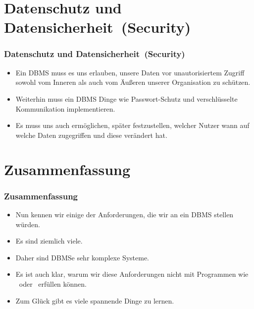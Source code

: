 \documentclass[aspectratio=169,mathserif,notheorems]{beamer}%
\begin{document}
\section{Datenschutz und Datensicherheit~(Security)}%
\begin{frame}%
\frametitle{Datenschutz und Datensicherheit~(Security)}
\begin{itemize}%
\item Ein DBMS muss es uns erlauben, unsere Daten vor unautorisiertem Zugriff sowohl vom Inneren als auch vom Äußeren unserer Organisation zu schützen.%
\item<7-> Weiterhin muss ein DBMS Dinge wie Passwort-Schutz und verschlüsselte Kommunikation implementieren.
\item<8-> Es muss uns auch ermöglichen, später festzustellen, welcher Nutzer wann auf welche Daten zugegriffen und diese verändert hat.%
\end{itemize}%
\end{frame}%
%
\section{Zusammenfassung}%
\begin{frame}%
\frametitle{Zusammenfassung}%
\begin{itemize}%
\item Nun kennen wir einige der Anforderungen, die wir an ein DBMS stellen würden.%
\item<2-> Es sind ziemlich viele.%
\item<3-> Daher sind DBMSe sehr komplexe Systeme.%
\item<4-> Es ist auch klar, warum wir diese Anforderungen nicht mit Programmen wie \microsoftExcel\ oder \libreofficeCalc\ erfüllen können.%
\item<5-> Zum Glück gibt es viele spannende Dinge zu lernen.%
\end{itemize}%
\end{frame}%
%
\endPresentation%
\end{document}
